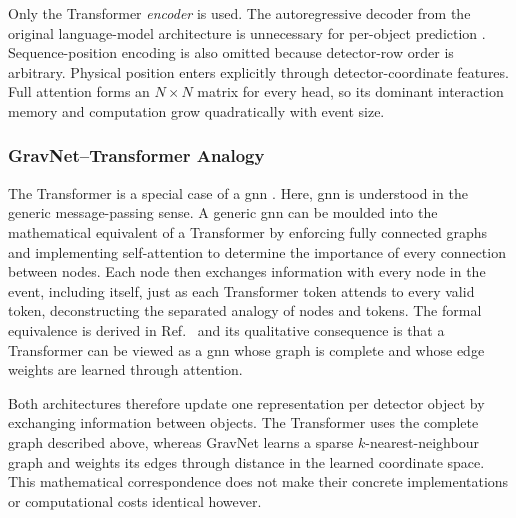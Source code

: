 

Only the Transformer \textit{encoder} is used. The autoregressive decoder from
the original language-model architecture is unnecessary for per-object
prediction \cite{vaswani2017attention}. Sequence-position encoding is also
omitted because detector-row order is arbitrary. Physical position enters
explicitly through detector-coordinate features.
Full attention forms an
\(N\times N\) matrix for every head, so its dominant interaction memory and
computation grow quadratically with event size.













\subsubsection{GravNet--Transformer Analogy}
\label{sec:gravnet_transformer_comparison}

The Transformer is a special case of a \gls{gnn} \cite{joshi2025transformersgnn}. Here, \gls{gnn} is understood in the
generic message-passing sense. A generic
\gls{gnn} can be moulded into the mathematical equivalent of a Transformer by enforcing fully connected graphs and implementing self-attention to determine the importance
of every connection between nodes. Each node then exchanges information with every node in
the event, including itself, just as each Transformer token attends to every
valid token, deconstructing the separated analogy of nodes and tokens. The formal equivalence is derived in
Ref.~\cite{joshi2025transformersgnn} and its qualitative consequence is that a
Transformer can be viewed as a \gls{gnn} whose graph is complete and whose edge
weights are learned through attention.

Both architectures therefore update one representation per detector object by
exchanging information between objects. The Transformer uses the complete
graph described above, whereas GravNet learns a sparse \(k\)-nearest-neighbour
graph and weights its edges through distance in the learned coordinate space.
This mathematical correspondence does not make their concrete implementations
or computational costs identical however.

